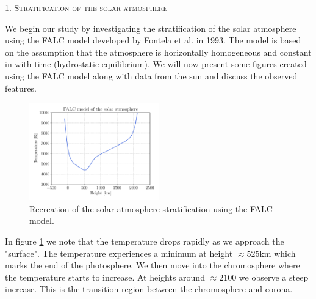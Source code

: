 \documentclass[a4paper,11.5pt,]{article}
\begin{document}
\begin{multicols}{2}

\begin{center}
\textsc{1. Stratification of the solar atmosphere}
\end{center}

We begin our study by investigating the stratification of the solar atmosphere using the FALC model developed by Fontela et al. in 1993. The model is based on the assumption that the atmosphere is horizontally homogeneous and constant in with time (hydrostatic equilibrium).
We will now present some figures created using the FALC model along with data from the sun and discuss the observed features.

\begin{figure}[H]
    \centering
    \includegraphics[width = 0.5\textwidth]{figures/1.2/FALCsolar_atmosphere.pdf}
    \caption{Recreation of the solar atmosphere stratification using the FALC model.}
    \label{fig: FALC atmo}
\end{figure}

 In figure \ref{fig: FALC atmo} we note that the temperature drops rapidly as we approach the "surface". The temperature experiences a minimum at height  $\approx 525$km which marks the end of the photosphere. We then move into the chromosphere where the temperature starts to increase. At heights around $\approx 2100$ we observe a steep increase. This is the transition region between the chromosphere and corona.


\end{multicols}
\end{document}
